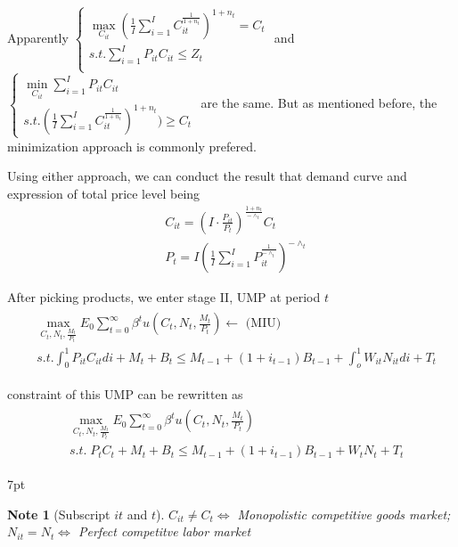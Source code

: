 \documentclass{article}
\newenvironment{blueblock}{
\def\FrameCommand{
  \hspace{1pt}
    {\color{DarkBlue}
    \vrule width 2pt}
    {\color{blueshade}
    \vrule width 4pt}
  \colorbox{blueshade}
}
\MakeFramed{
  \advance
  \hsize-
  \width
  \FrameRestore}
\noindent\hspace{-4.55pt}%
\begin{adjustwidth}{}{7pt}
\vspace{2pt}\vspace{2pt}
}
{\vspace{2pt}\end{adjustwidth}\endMakeFramed}
\newtheorem{note}{Note}
\begin{document}
Apparently
$\begin{cases}
\max\limits_{C_{it}}(\frac{1}{I}\sum\limits_{i=1}^{I}C_{it}^{\frac{1}{1+n_{t}}})^{1+n_{t}}=C_{t}
\\
s.t. \sum\limits_{i=1}^{I}P_{it} C_{it}\leqslant Z_{t} \\
\end{cases}$
and
$\begin{cases} \min\limits_{C_{it}}\sum\limits_{i=1}^{I}P_{it}C_{it} \\
s.t. (\frac{1}{I}\sum\limits_{i=1}^{I}C_{it}^{\frac{1}{1+n_{t}}})^{1+n_{t}})\geqslant C_{t}
\end{cases}$
are the same. But as mentioned before, the minimization approach is commonly prefered.


Using either approach, we can conduct the result that demand curve and expression of total price level being
\begin{align}
&C_{it}=(I\cdot \frac{P_{it}}{P_{t}})^{\frac{1+n_{t}}{-\wedge_t}}C_{t}
\\&P_{t}=I(\frac{1}{I}\sum\limits_{i=1}^{I}P_{it}^\frac{1}{-\wedge_t})^{-\wedge_t}
\end{align}

After picking products, we enter stage II, UMP at period $t$ 
\begin{align}
\begin{split}
&\max_{C_{t},N_{t},\frac{M_{t}}{P_{t}}} E_{0} \sum\limits_{t=0}^{\infty} \beta^{t} u\left(C_{t},N_{t},\frac{M_{t}}{P_{t}}\right) \leftarrow\text{ (MIU)}
\\&s.t. \int_{0}^{1}P_{it}C_{it}di +M_{t}+B_{t}\leqslant M_{t-1}+(1+i_{t-1})B_{t-1}+\int_{o}^{1}W_{it}N_{it}di+T_{t}
\end{split}
\end{align}

constraint of this UMP can be rewritten as
\begin{align}
\begin{split}
&\max_{C_{t},N_{t},\frac{M_{t}}{P_{t}}} E_{0} \sum\limits_{t=0}^{\infty} \beta^{t} u\left(C_{t},N_{t},\frac{M_{t}}{P_{t}}\right)
\\&
s.t. \;P_{t}C_{t}+M_{t}+B_{t}\leqslant M_{t-1}+(1+i_{t-1})B_{t-1}+W_{t}N_{t}+T_{t}
\end{split}
\end{align}

\begin{blueblock}
\begin{note}[Subscript $it$ and $t$]
$C_{it}\neq C_t \Leftrightarrow $ Monopolistic competitive goods market; $N_{it}= N_t \Leftrightarrow $ Perfect competitve labor market
\end{note}
\end{blueblock}
\end{document}
